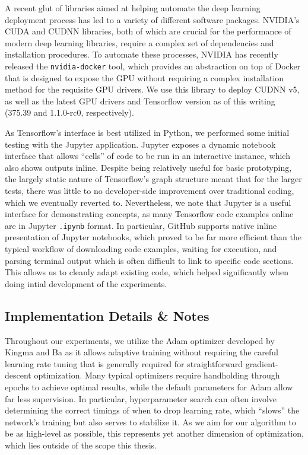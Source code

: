 A recent glut of libraries aimed at helping automate the deep learning deployment process has led to a variety of different software packages.
NVIDIA's CUDA and CUDNN libraries, both of which are crucial for the performance of modern deep learning libraries, require a complex set of dependencies and installation procedures.
To automate these processes, NVIDIA has recently released the \texttt{nvidia-docker} tool, which provides an abstraction on top of Docker that is designed to expose the GPU without requiring a complex installation method for the requisite GPU drivers.
We use this library to deploy CUDNN v5, as well as the latest GPU drivers and Tensorflow version as of this writing (375.39 and 1.1.0-rc0, respectively).

As Tensorflow's interface is best utilized in Python, we performed some initial testing with the Jupyter application.
Jupyter exposes a dynamic notebook interface that allows ``cells'' of code to be run in an interactive instance, which also shows outputs inline.
Despite being relatively useful for basic prototyping, the largely static nature of Tensorflow's graph structure meant that for the larger tests, there was little to no developer-side improvement over traditional coding, which we eventually reverted to.
Nevertheless, we note that Jupyter is a useful interface for demonstrating concepts, as many Tensorflow code examples online are in Jupyter \texttt{.ipynb} format.
In particular, GitHub supports native inline presentation of Jupyter notebooks, which proved to be far more efficient than the typical workflow of downloading code examples, waiting for execution, and parsing terminal output which is often difficult to link to specific code sections.
This allows us to cleanly adapt existing code, which helped significantly when doing intial development of the experiments.

\subsection{Implementation Details \& Notes}
Throughout our experiments, we utilize the Adam optimizer developed by Kingma and Ba \cite{kingma2014adam} as it allows adaptive training without requiring the careful learning rate tuning that is generally required for straightforward gradient-descent optimization.
Many typical optimizers require handholding through epochs to achieve optimal results, while the default parameters for Adam allow far less supervision.
In particular, hyperparameter search can often involve determining the correct timings of when to drop learning rate, which ``slows'' the network's training but also serves to stabilize it.
As we aim for our algorithm to be as high-level as possible, this represents yet another dimension of optimization, which lies outside of the scope this thesis.

